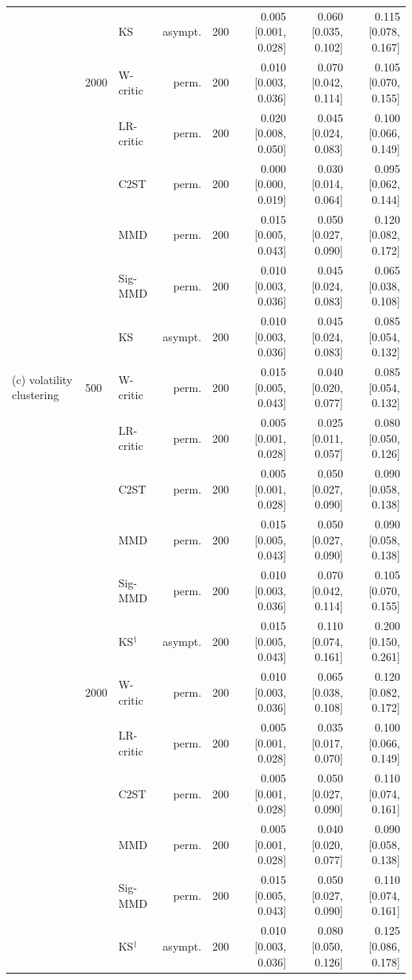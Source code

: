 \begin{tabular}{lllrrrrr}
 &  & KS & asympt. & 200 & 0.005 [0.001, 0.028] & 0.060 [0.035, 0.102] & 0.115 [0.078, 0.167] \\
 & 2000 & W-critic & perm. & 200 & 0.010 [0.003, 0.036] & 0.070 [0.042, 0.114] & 0.105 [0.070, 0.155] \\
 &  & LR-critic & perm. & 200 & 0.020 [0.008, 0.050] & 0.045 [0.024, 0.083] & 0.100 [0.066, 0.149] \\
 &  & C2ST & perm. & 200 & 0.000 [0.000, 0.019] & 0.030 [0.014, 0.064] & 0.095 [0.062, 0.144] \\
 &  & MMD & perm. & 200 & 0.015 [0.005, 0.043] & 0.050 [0.027, 0.090] & 0.120 [0.082, 0.172] \\
 &  & Sig-MMD & perm. & 200 & 0.010 [0.003, 0.036] & 0.045 [0.024, 0.083] & 0.065 [0.038, 0.108] \\
 &  & KS & asympt. & 200 & 0.010 [0.003, 0.036] & 0.045 [0.024, 0.083] & 0.085 [0.054, 0.132] \\
(c) volatility clustering & 500 & W-critic & perm. & 200 & 0.015 [0.005, 0.043] & 0.040 [0.020, 0.077] & 0.085 [0.054, 0.132] \\
 &  & LR-critic & perm. & 200 & 0.005 [0.001, 0.028] & 0.025 [0.011, 0.057] & 0.080 [0.050, 0.126] \\
 &  & C2ST & perm. & 200 & 0.005 [0.001, 0.028] & 0.050 [0.027, 0.090] & 0.090 [0.058, 0.138] \\
 &  & MMD & perm. & 200 & 0.015 [0.005, 0.043] & 0.050 [0.027, 0.090] & 0.090 [0.058, 0.138] \\
 &  & Sig-MMD & perm. & 200 & 0.010 [0.003, 0.036] & 0.070 [0.042, 0.114] & 0.105 [0.070, 0.155] \\
 &  & KS$^{\dagger}$ & asympt. & 200 & 0.015 [0.005, 0.043] & 0.110 [0.074, 0.161] & 0.200 [0.150, 0.261] \\
 & 2000 & W-critic & perm. & 200 & 0.010 [0.003, 0.036] & 0.065 [0.038, 0.108] & 0.120 [0.082, 0.172] \\
 &  & LR-critic & perm. & 200 & 0.005 [0.001, 0.028] & 0.035 [0.017, 0.070] & 0.100 [0.066, 0.149] \\
 &  & C2ST & perm. & 200 & 0.005 [0.001, 0.028] & 0.050 [0.027, 0.090] & 0.110 [0.074, 0.161] \\
 &  & MMD & perm. & 200 & 0.005 [0.001, 0.028] & 0.040 [0.020, 0.077] & 0.090 [0.058, 0.138] \\
 &  & Sig-MMD & perm. & 200 & 0.015 [0.005, 0.043] & 0.050 [0.027, 0.090] & 0.110 [0.074, 0.161] \\
 &  & KS$^{\dagger}$ & asympt. & 200 & 0.010 [0.003, 0.036] & 0.080 [0.050, 0.126] & 0.125 [0.086, 0.178] \\

\end{tabular}
